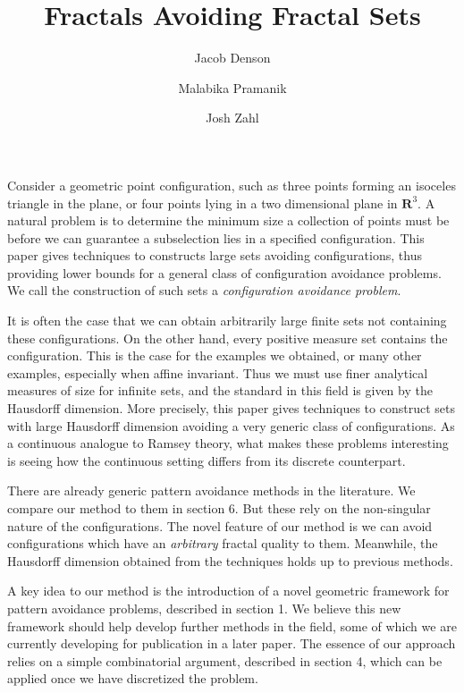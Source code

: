 \documentclass{article}
\title{Fractals Avoiding Fractal Sets}
\author{Jacob Denson\\ \and Malabika Pramanik\\ \and Josh Zahl}
\theoremstyle{plain}
\theoremstyle{plain}
\begin{document}
\maketitle

\begin{multicols}{2}

\begin{abstract}
	\blindtext[1]
\end{abstract}


Consider a geometric point configuration, such as three points forming an isoceles triangle in the plane, or four points lying in a two dimensional plane in $\mathbf{R}^3$. A natural problem is to determine the minimum size a collection of points must be before we can guarantee a subselection lies in a specified configuration. This paper gives techniques to constructs large sets avoiding configurations, thus providing lower bounds for a general class of configuration avoidance problems. We call the construction of such sets a {\it configuration avoidance problem}.

It is often the case that we can obtain arbitrarily large finite sets not containing these configurations. On the other hand, every positive measure set contains the configuration. This is the case for the examples we obtained, or many other examples, especially when affine invariant. Thus we must use finer analytical measures of size for infinite sets, and the standard in this field is given by the Hausdorff dimension. More precisely, this paper gives techniques to construct sets with large Hausdorff dimension avoiding a very generic class of configurations. As a continuous analogue to Ramsey theory, what makes these problems interesting is seeing how the continuous setting differs from its discrete counterpart.

There are already generic pattern avoidance methods in the literature. We compare our method to them in section 6. But these rely on the non-singular nature of the configurations. The novel feature of our method is we can avoid configurations which have an {\it arbitrary} fractal quality to them. Meanwhile, the Hausdorff dimension obtained from the techniques holds up to previous methods.

A key idea to our method is the introduction of a novel geometric framework for pattern avoidance problems, described in section 1. We believe this new framework should help develop further methods in the field, some of which we are currently developing for publication in a later paper. The essence of our approach relies on a simple combinatorial argument, described in section 4, which can be applied once we have discretized the problem.


\end{multicols}
\end{document}
